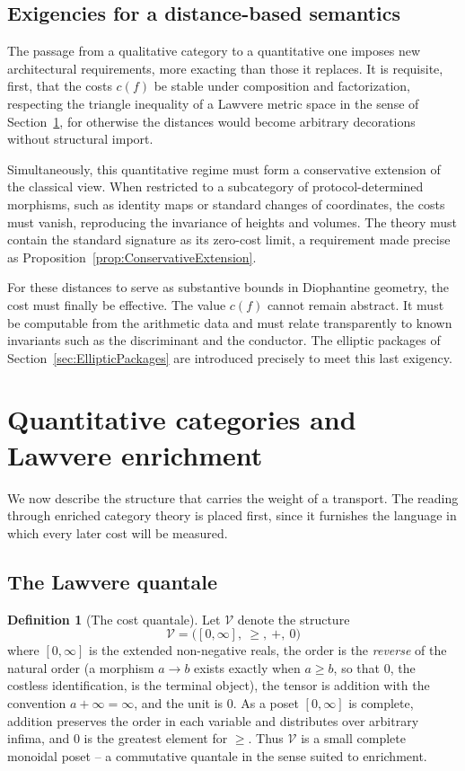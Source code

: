 \documentclass[10pt, reqno]{amsart}
\theoremstyle{plain}
\theoremstyle{definition}
\newtheorem{definition}[theorem]{Definition}
\theoremstyle{plain}
\begin{document}
\subsection{Exigencies for a distance-based semantics}

The passage from a qualitative category to a quantitative one imposes new architectural requirements, more exacting than those it replaces. It is requisite, first, that the costs $c(f)$ be stable under composition and factorization, respecting the triangle inequality of a Lawvere metric space in the sense of Section~\ref{sec:QuantitativeCategories}, for otherwise the distances would become arbitrary decorations without structural import.

Simultaneously, this quantitative regime must form a conservative extension of the classical view. When restricted to a subcategory of protocol-determined morphisms, such as identity maps or standard changes of coordinates, the costs must vanish, reproducing the invariance of heights and volumes. The theory must contain the standard signature as its zero-cost limit, a requirement made precise as Proposition~\ref{prop:ConservativeExtension}.

For these distances to serve as substantive bounds in Diophantine geometry, the cost must finally be effective. The value $c(f)$ cannot remain abstract. It must be computable from the arithmetic data and must relate transparently to known invariants such as the discriminant and the conductor. The elliptic packages of Section~\ref{sec:EllipticPackages} are introduced precisely to meet this last exigency.


\section{Quantitative categories and Lawvere enrichment}\label{sec:QuantitativeCategories}

We now describe the structure that carries the weight of a transport. The reading through enriched category theory is placed first, since it furnishes the language in which every later cost will be measured.

\subsection{The Lawvere quantale}

\begin{definition}[The cost quantale]\label{def:CostQuantale}
Let $\mathcal{V}$ denote the structure
\[
  \mathcal{V} = \bigl([0,\infty],\ \ge,\ +,\ 0\bigr)
\]
where $[0,\infty]$ is the extended non-negative reals, the order is the \emph{reverse} of the natural order (a morphism $a \to b$ exists exactly when $a \ge b$, so that $0$, the costless identification, is the terminal object), the tensor is addition with the convention $a + \infty = \infty$, and the unit is $0$. As a poset $[0,\infty]$ is complete, addition preserves the order in each variable and distributes over arbitrary infima, and $0$ is the greatest element for $\ge$. Thus $\mathcal{V}$ is a small complete monoidal poset -- a commutative quantale in the sense suited to enrichment.
\end{definition}
\end{document}
